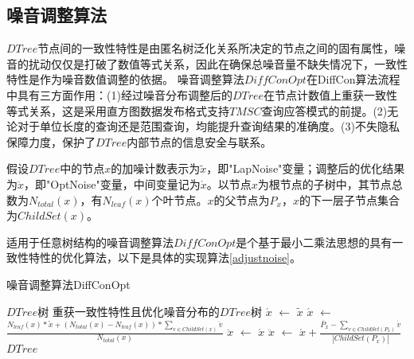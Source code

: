 




\subsection{噪音调整算法}

$DTree$节点间的一致性特性是由匿名树泛化关系所决定的节点之间的固有属性，噪音的扰动仅仅是打破了数值等式关系，因此在确保总噪音量不缺失情况下，一致性特性是作为噪音数值调整的依据。
噪音调整算法$DiffConOpt$在DiffCon算法流程中具有三方面作用：(1)经过噪音分布调整后的$DTree$在节点计数值上重获一致性等式关系，这是采用直方图数据发布格式支持$TMSC$查询应答模式的前提。(2)无论对于单位长度的查询还是范围查询，均能提升查询结果的准确度。(3)不失隐私保障力度，保护了$DTree$内部节点的信息安全与联系。

假设$DTree$中的节点$x$的加噪计数表示为$\tilde{x}$，即"LapNoise"变量；调整后的优化结果为$\ddot{x}$，即"OptNoise"变量，中间变量记为$\acute{x}$。以节点$x$为根节点的子树中，其节点总数为$N_{total}(x)$，有$N_{leaf}(x)$个叶节点。$x$的父节点为$P_{x}$，$x$的下一层子节点集合为$ChildSet(x)$。

适用于任意树结构的噪音调整算法$DiffConOpt$是个基于最小二乘法思想的具有一致性特性的优化算法，以下是具体的实现算法\ref{adjustnoise}。

\begin{algorithm}[H]
	\caption{噪音调整算法DiffConOpt} 
	\label{adjustnoise}
	\begin{algorithmic}[1]
		\REQUIRE $DTree$树
		\ENSURE 重获一致性特性且优化噪音分布的$DTree$树
		\STATE $\acute{x}$ $\leftarrow$ $\tilde{x}$ 
		\ELSE
		\STATE  $\acute{x}$ $\leftarrow$ $\frac{{N_{leaf}(x) * \tilde{x} + (N_{total}(x) - N_{leaf}(x)) * \sum\nolimits_{v \in ChildSet(x)} {\ddot{v}}}}{{N_{total}(x)}}$
		\ENDIF
		\ENDFOR
		\STATE  $\ddot{x}$ $\leftarrow$ $\acute{x}$
		\ELSE
		\STATE  $\ddot{x}$ $\leftarrow$ $\acute{x} + \frac{{\ddot{P_{x}} - \sum\nolimits_{v \in ChildSet(P_{x})} {\acute{v}}}}{|ChildSet(P_{x})|}$
		\ENDIF
		\ENDFOR
		\RETURN $DTree$
	\end{algorithmic}
\end{algorithm}

